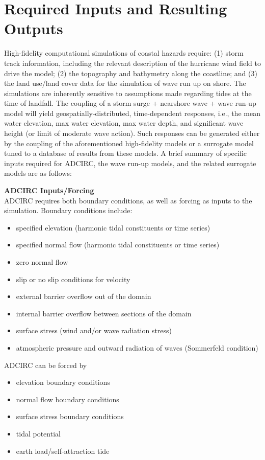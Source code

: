 \section{Required Inputs and Resulting Outputs}
\label{sec:storm_surge_io}

High-fidelity computational simulations of coastal hazards require: (1) storm track information, including the relevant description of the hurricane wind field to drive the model; (2) the topography and bathymetry along the coastline; and (3) the land use/land cover data for the simulation of wave run up on shore. The simulations are inherently sensitive to assumptions made regarding tides at the time of landfall. The coupling of a storm surge + nearshore wave + wave run-up model will yield geospatially-distributed, time-dependent responses, i.e., the mean water elevation, max water elevation, max water depth, and significant wave height (or limit of moderate wave action). Such responses can be generated either by the coupling of the aforementioned high-fidelity models or a surrogate model tuned to a database of results from these models. A brief summary of specific inputs required for ADCIRC, the wave run-up models, and the related surrogate models are as follows:
\newline

\noindent\textbf{ADCIRC Inputs/Forcing } \\ADCIRC requires both boundary conditions, as well as forcing as inputs to the simulation. Boundary conditions include: 
\begin{itemize}
    \item specified elevation (harmonic tidal constituents or time series)
    \item specified normal flow (harmonic tidal constituents or time series)
    \item zero normal flow
    \item slip or no slip conditions for velocity
    \item external barrier overflow out of the domain
    \item internal barrier overflow between sections of the domain
    \item surface stress (wind and/or wave radiation stress)
    \item atmospheric pressure and outward radiation of waves (Sommerfeld condition)
\end{itemize}
	
\noindent ADCIRC can be forced by 
\begin{itemize}
    \item elevation boundary conditions
    \item normal flow boundary conditions
    \item surface stress boundary conditions
    \item tidal potential
    \item earth load/self-attraction tide
\end{itemize}

